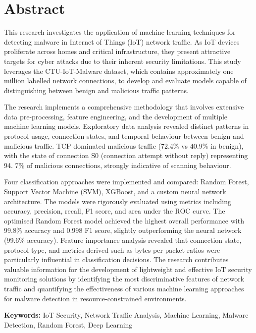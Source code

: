 \chapter*{\Large \center Abstract}

This research investigates the application of machine learning techniques for detecting malware in Internet of Things (IoT) network traffic. As IoT devices proliferate across homes and critical infrastructure, they present attractive targets for cyber attacks due to their inherent security limitations. This study leverages the CTU-IoT-Malware dataset, which contains approximately one million labelled network connections, to develop and evaluate models capable of distinguishing between benign and malicious traffic patterns.

The research implements a comprehensive methodology that involves extensive data pre-processing, feature engineering, and the development of multiple machine learning models. Exploratory data analysis revealed distinct patterns in protocol usage, connection states, and temporal behaviour between benign and malicious traffic. TCP dominated malicious traffic (72.4\% vs 40.9\% in benign), with the state of connection S0 (connection attempt without reply) representing 94. 7\% of malicious connections, strongly indicative of scanning behaviour.

Four classification approaches were implemented and compared: Random Forest, Support Vector Machine (SVM), XGBoost, and a custom neural network architecture. The models were rigorously evaluated using metrics including accuracy, precision, recall, F1 score, and area under the ROC curve. The optimised Random Forest model achieved the highest overall performance with 99.8\% accuracy and 0.998 F1 score, slightly outperforming the neural network (99.6\% accuracy). Feature importance analysis revealed that connection state, protocol type, and metrics derived such as bytes per packet ratios were particularly influential in classification decisions. The research contributes valuable information for the development of lightweight and effective IoT security monitoring solutions by identifying the most discriminative features of network traffic and quantifying the effectiveness of various machine learning approaches for malware detection in resource-constrained environments.

\vspace{0.5cm}
\textbf{Keywords:} IoT Security, Network Traffic Analysis, Machine Learning, Malware Detection, Random Forest, Deep Learning
